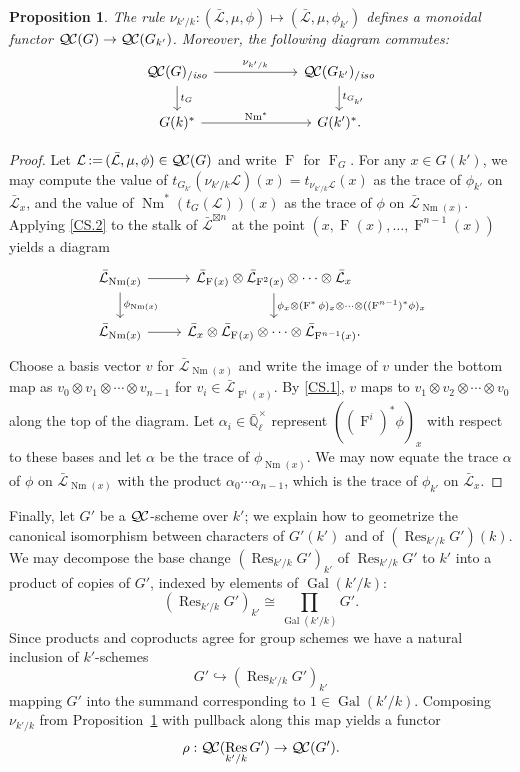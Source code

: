 \documentclass[11pt]{amsart}
\theoremstyle{plain}
\newtheorem{proposition}[theorem]{Proposition}
\theoremstyle{definition}
\theoremstyle{remark}
\newcommand{\EE}{\mathbb{\bar Q}_\ell}
\newcommand{\EEx}{\EE^\times}
\DeclareMathOperator{\Gal}{Gal}
\newcommand{\Frob}[1]{\operatorname{F}_{#1}}
\DeclareMathOperator{\Res}{Res}
\DeclareMathOperator{\Nm}{Nm}
\newcommand{\ceq}{{\, :=\, }}
\newcommand{\qcs}[1]{{\mathcal{#1}}}
\newcommand{\gqcs}[1]{{\mathcal{\bar #1}}}
\newcommand{\QC}{{\mathcal{Q\hskip-0.8pt C}}}
\newcommand{\QCiso}[1]{\QC(#1)_{/\textit{iso}}}
\newcommand{\trFrob}[1]{t_{#1}}
\newcommand\Clifton[1]{\marginpar{\smaller\smaller CC: #1}}
\begin{document}
\begin{proposition}\label{prop:basechange}
 The rule $\nu_{k'/k}: (\gqcs{L}, \mu, \phi) \mapsto (\gqcs{L}, \mu, \phi_{k'})$ 
 defines a monoidal functor $\QC(G) \to \QC(G_{k'})$. 
 Moreover, the following diagram commutes:
\[
\begin{tikzcd}[column sep=60]
\QCiso{G} \rar{\nu_{k'/k}} \dar{\trFrob{G}} & \QCiso{G_{k'}} \dar{\trFrob{G_{k'}}} \\
G(k)^*  \rar{\Nm^*} & G(k')^*.
\end{tikzcd}
\]
\end{proposition}
\begin{proof}
Let $\qcs{L} \ceq (\gqcs{L}, \mu, \phi) \in \QC(G)$ and write $\Frob{}$ for $\Frob{G}$.  For any $x \in G(k')$,
we may compute the value of $t_{G_{k'}}(\nu_{k'/k}\qcs{L})(x)= t_{\nu_{k'/k}\qcs{L}}(x)$ as the trace of $\phi_{k'}$ on $\gqcs{L}_x$,
\Clifton{Please note what I did here.}
and the value of $\Nm^*(t_G(\qcs{L}))(x)$ as the trace of $\phi$ on $\gqcs{L}_{\Nm(x)}$.
Applying \ref{CS.2} to the stalk of $\gqcs{L}^{\boxtimes n}$ at the point $(x, \Frob{}(x), \ldots, \Frob{}^{n-1}(x))$ yields a diagram
\[
\begin{tikzcd}
\gqcs{L}_{\Nm(x)} \rar \dar{\phi_{\Nm(x)}} & \gqcs{L}_{\Frob{}(x)} \otimes \gqcs{L}_{\Frob{}^2(x)} \otimes \cdots \otimes \gqcs{L}_x
\dar{\phi_x \otimes (\Frob{}^*\phi)_x \otimes \cdots \otimes ((\Frob{}^{n-1})^*\phi)_x} \\
\gqcs{L}_{\Nm(x)} \rar & \gqcs{L}_x \otimes \gqcs{L}_{\Frob{}(x)} \otimes \cdots \otimes \gqcs{L}_{\Frob{}^{n-1}(x)}.
\end{tikzcd}
\]
Choose a basis vector $v$ for $\gqcs{L}_{\Nm(x)}$ and write the image of $v$ under the
bottom map as $v_0 \otimes v_1 \otimes \cdots \otimes v_{n-1}$
for $v_i \in \gqcs{L}_{\Frob{}^i(x)}$.  By \ref{CS.1}, $v$ maps to
$v_1 \otimes v_2 \otimes \cdots \otimes v_0$ along the top of the diagram.
Let $\alpha_i \in \EEx$ represent $((\Frob{}^i)^*\phi)_x$ with respect to these bases and let $\alpha$ be
the trace of $\phi_{\Nm(x)}$.  We may now equate the trace $\alpha$ of $\phi$ on $\gqcs{L}_{\Nm(x)}$
with the product $\alpha_0 \cdots \alpha_{n-1}$, which is the trace of $\phi_{k'}$ on $\gqcs{L}_x$.
\end{proof}

Finally, let $G'$ be a $\QC$-scheme over $k'$;
we explain how to geometrize the canonical isomorphism between characters of $G'(k')$ and of $(\Res_{k'/k}G')(k)$.
We may decompose the base change $(\Res_{k'/k}G')_{k'}$ of $\Res_{k'/k}G'$ to $k'$
into a product of copies of $G'$, indexed by elements of $\Gal(k'/k)$:
\[
(\Res_{k'/k}G')_{k'} \cong \prod_{\Gal(k'/k)} G'.
\]
Since products and coproducts agree for group schemes we have a natural inclusion of $k'$-schemes 
\[
G' \hookrightarrow (\Res_{k'/k}G')_{k'}
\]
mapping $G'$ into the summand corresponding to $1 \in \Gal(k'/k)$.  Composing $\nu_{k'/k}$ 
from Proposition~\ref{prop:basechange} with pullback along this map yields a functor
\[
\rho : \QC(\Res_{k'/k}G') \to \QC(G').
\]
\end{document}
